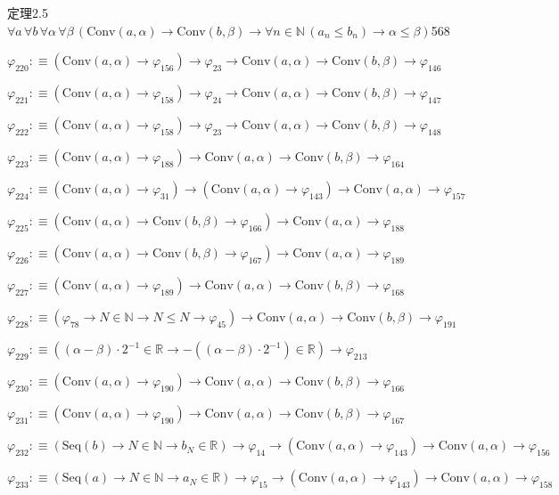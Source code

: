 \begin{fullproof}{定理2.5}{$\forall a\,\forall b\,\forall \alpha\,\forall \beta\,(\mathrm{Conv}(a,\alpha) \to \mathrm{Conv}(b,\beta) \to \forall n \in \mathbb{N}\,(a_{n} \leq b_{n}) \to \alpha \leq \beta)$}{568}
\begin{abbrevlist}
\item $\varphi_{220} :\equiv (\mathrm{Conv}(a,\alpha) \to \varphi_{156}) \to \varphi_{23} \to \mathrm{Conv}(a,\alpha) \to \mathrm{Conv}(b,\beta) \to \varphi_{146}$
\item $\varphi_{221} :\equiv (\mathrm{Conv}(a,\alpha) \to \varphi_{158}) \to \varphi_{24} \to \mathrm{Conv}(a,\alpha) \to \mathrm{Conv}(b,\beta) \to \varphi_{147}$
\item $\varphi_{222} :\equiv (\mathrm{Conv}(a,\alpha) \to \varphi_{158}) \to \varphi_{23} \to \mathrm{Conv}(a,\alpha) \to \mathrm{Conv}(b,\beta) \to \varphi_{148}$
\item $\varphi_{223} :\equiv (\mathrm{Conv}(a,\alpha) \to \varphi_{188}) \to \mathrm{Conv}(a,\alpha) \to \mathrm{Conv}(b,\beta) \to \varphi_{164}$
\item $\varphi_{224} :\equiv (\mathrm{Conv}(a,\alpha) \to \varphi_{31}) \to (\mathrm{Conv}(a,\alpha) \to \varphi_{143}) \to \mathrm{Conv}(a,\alpha) \to \varphi_{157}$
\item $\varphi_{225} :\equiv (\mathrm{Conv}(a,\alpha) \to \mathrm{Conv}(b,\beta) \to \varphi_{166}) \to \mathrm{Conv}(a,\alpha) \to \varphi_{188}$
\item $\varphi_{226} :\equiv (\mathrm{Conv}(a,\alpha) \to \mathrm{Conv}(b,\beta) \to \varphi_{167}) \to \mathrm{Conv}(a,\alpha) \to \varphi_{189}$
\item $\varphi_{227} :\equiv (\mathrm{Conv}(a,\alpha) \to \varphi_{189}) \to \mathrm{Conv}(a,\alpha) \to \mathrm{Conv}(b,\beta) \to \varphi_{168}$
\item $\varphi_{228} :\equiv (\varphi_{78} \to N \in \mathbb{N} \to N \leq N \to \varphi_{45}) \to \mathrm{Conv}(a,\alpha) \to \mathrm{Conv}(b,\beta) \to \varphi_{191}$
\item $\varphi_{229} :\equiv ((\alpha - \beta) \cdot 2^{-1} \in \mathbb{R} \to -((\alpha - \beta) \cdot 2^{-1}) \in \mathbb{R}) \to \varphi_{213}$
\item $\varphi_{230} :\equiv (\mathrm{Conv}(a,\alpha) \to \varphi_{190}) \to \mathrm{Conv}(a,\alpha) \to \mathrm{Conv}(b,\beta) \to \varphi_{166}$
\item $\varphi_{231} :\equiv (\mathrm{Conv}(a,\alpha) \to \varphi_{190}) \to \mathrm{Conv}(a,\alpha) \to \mathrm{Conv}(b,\beta) \to \varphi_{167}$
\item $\varphi_{232} :\equiv (\mathrm{Seq}(b) \to N \in \mathbb{N} \to b_{N} \in \mathbb{R}) \to \varphi_{14} \to (\mathrm{Conv}(a,\alpha) \to \varphi_{143}) \to \mathrm{Conv}(a,\alpha) \to \varphi_{156}$
\item $\varphi_{233} :\equiv (\mathrm{Seq}(a) \to N \in \mathbb{N} \to a_{N} \in \mathbb{R}) \to \varphi_{15} \to (\mathrm{Conv}(a,\alpha) \to \varphi_{143}) \to \mathrm{Conv}(a,\alpha) \to \varphi_{158}$

\end{abbrevlist}
\end{fullproof}
